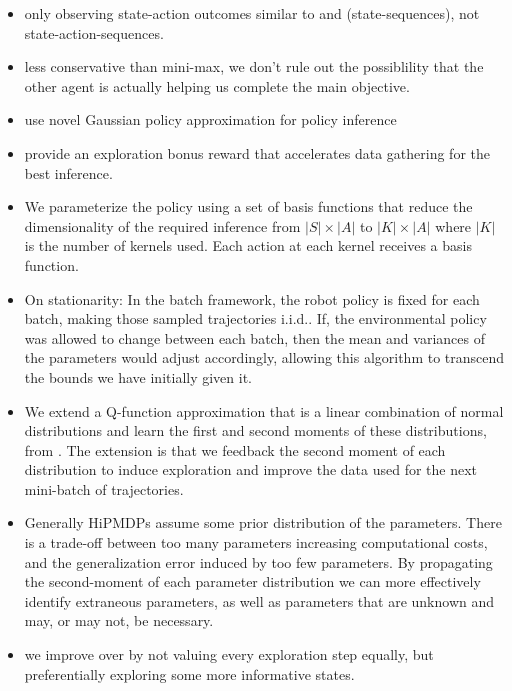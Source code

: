     \begin{itemize}
        \item only observing state-action outcomes similar to \cite{renato} and \cite{lim2013reinforcement}
            (state-sequences), not state-action-sequences.

        \item less conservative than mini-max, we don't rule out the possiblility that the other agent is actually
            helping us complete the main objective.
        \item use novel Gaussian policy approximation for policy inference
        \item provide an exploration bonus reward that accelerates data gathering for the best
            inference.
        \item We parameterize the policy using a set of basis functions that reduce the dimensionality of the required
            inference from $|S|\times|A|$ to $|K|\times|A|$ where $|K|$ is the number of kernels used. Each action at
            each kernel receives a basis function.
        \item On stationarity: In the batch framework, the robot policy is fixed for each batch, making those sampled
            trajectories i.i.d.. If, the environmental policy was allowed to change between each batch, then the mean
            and variances of the parameters would adjust accordingly, allowing this algorithm to transcend the bounds we
            have initially given it.

        \item We extend a Q-function approximation that is a linear combination of normal distributions and learn the
            first and second moments of these distributions, from \cite{tangkaratt2014model}. The extension is that we
            feedback the second moment of each distribution to induce exploration and improve the data used for the next
            mini-batch of trajectories.
        \item Generally \ac{HiPMDP}s assume some prior distribution of the parameters. There is a trade-off between too
            many parameters increasing computational costs, and the generalization error induced by too few parameters.
            By propagating the second-moment of each parameter distribution we can more effectively identify extraneous
            parameters, as well as parameters that are unknown and may, or may not, be necessary.
        \item we improve over \Rmax by not valuing every exploration step equally, but preferentially exploring some
            more informative states.


\end{itemize}
